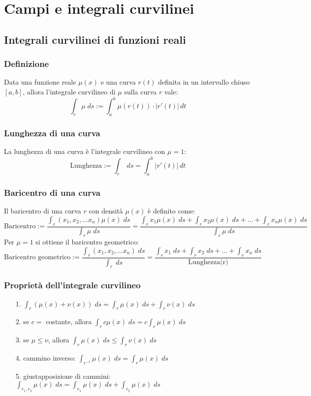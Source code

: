\documentclass[a4paper]{article}
\begin{document}
\newpage


\section{Campi e integrali curvilinei}
\subsection{Integrali curvilinei di funzioni reali}
\subsubsection*{Definizione}
Data una funzione reale \(\mu(x)\) e una curva \(r(t)\) definita in un intervallo chiuso \([a,b]\), allora l'integrale curvilineo
di \(\mu\) sulla curva \(r\) vale:
\[\int_r \mu \; ds := \int_a^b \mu(r(t)) \cdot \left| r'(t) \right| \, dt\]

\subsubsection*{Lunghezza di una curva}
La lunghezza di una curva è l'integrale curvilineo con \(\mu = 1\):
\[\text{Lunghezza} := \int_r \; ds = \int_a^b \left| r'(t) \right| \, dt\]

\subsubsection*{Baricentro di una curva}
Il baricentro di una curva \(r\) con densità \(\mu(x)\) è definito come:
\[\text{Baricentro} := \frac{\displaystyle \int_{r} (x_1, x_2, \dots x_n) \mu(x) \; ds }{\displaystyle \int_r \mu \; ds} = \frac{\displaystyle \int_{r} x_1 \mu(x) \; ds + \int_{r} x_2 \mu(x) \; ds + \dots + \int_{r} x_n \mu(x) \; ds }{\displaystyle \int_r \mu \; ds}\]
Per \(\mu = 1\) si ottiene il baricentro geometrico:
\[\text{Baricentro geometrico} := \frac{\displaystyle \int_{r} (x_1, x_2, \dots x_n) \; ds }{\displaystyle \int_r \; ds} = \frac{\displaystyle \int_{r} x_1 \; ds + \int_{r} x_2 \; ds + \dots + \int_{r} x_n \; ds }{\text{Lunghezza(r)}}\]

\subsubsection*{Proprietà dell'integrale curvilineo}
\begin{itemize}[topsep=3pt, itemsep=0pt]
	\item[1.] \(\displaystyle \int_r (\mu(x) + \nu(x)) \; ds = \int_r \mu(x) \; ds + \int_r \nu(x) \; ds\)
	\item[2.] se \(c =\) costante, allora \(\displaystyle \int_r c\mu(x) \; ds = c \int_r \mu(x) \; ds\)
	\item[3.] se \(\mu \leq \nu\), allora \(\displaystyle \int_r \mu(x) \; ds \leq \int_r \nu(x) \; ds\)
	\item[4.] cammino inverso: \(\displaystyle \int_{r^{-1}} \mu(x) \; ds = \int_r \mu(x) \; ds\)
	\item[5.] giustapposizione di cammini: \(\displaystyle \int_{r_1,r_2} \mu(x) \; ds = \int_{r_1} \mu(x) \; ds + \int_{r_2} \mu(x) \; ds\) 
\end{itemize}
\end{document}
